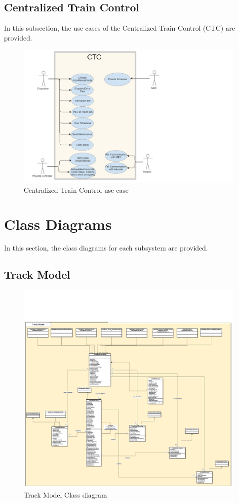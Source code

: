 \documentclass[]{article}
\begin{document}
\subsection{Centralized Train Control}
In this subsection, the use cases of the Centralized Train Control (CTC) are provided.
\begin{figure}[H]
	\centering
	\includegraphics[scale=.5]{ctcusecase.png}
	\caption{Centralized Train Control use case}
\end{figure}

\section{Class Diagrams}
In this section, the class diagrams for each subsystem are provided.
\subsection{Track Model}
\begin{figure}[H]
	\centering
	\includegraphics[scale=.2]{trackmodel.png}
	\caption{Track Model Class diagram}
\end{figure}
\end{document}
